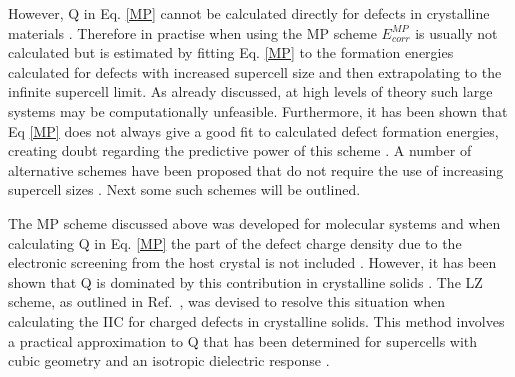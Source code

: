 \documentclass[11pt, twoside]{report}
\begin{document}
However, Q in Eq. \ref{MP} cannot be calculated directly for defects in crystalline materials \cite{Lany_defects_2008}. Therefore in practise when using the MP scheme $E^{MP}_{corr}$ is usually not calculated but is estimated by fitting Eq. \ref{MP} to the formation energies calculated for defects with increased supercell size and then extrapolating to the infinite supercell limit. As already discussed, at high levels of theory such large systems may be computationally unfeasible. Furthermore, it has been shown that Eq \ref{MP} does not always give a good fit to calculated defect formation energies, creating doubt regarding the predictive power of this scheme \cite{FNV}. A number of alternative schemes have been proposed that do not require the use of increasing supercell sizes \cite{MP, LeslieGillan, PeterSchultz, Lany_defects, FNV, kumagai_oba}. Next some such schemes will be outlined. 


The MP scheme \cite{MP} discussed above was developed for molecular systems and when calculating Q in Eq. \ref{MP} the part of the defect charge density due to the electronic screening from the host crystal is not included \cite{Lany_defects_2008, Lany_defects}. However, it has been shown that Q is dominated by this contribution in crystalline solids \cite{Lany_defects_2008}. The LZ scheme, as outlined in Ref.~, was devised to resolve this situation when calculating the IIC for charged defects in crystalline solids.
This method involves a practical approximation to Q that has been determined for supercells with cubic geometry and an isotropic dielectric response \cite{Durrant_defects}.
\end{document}
